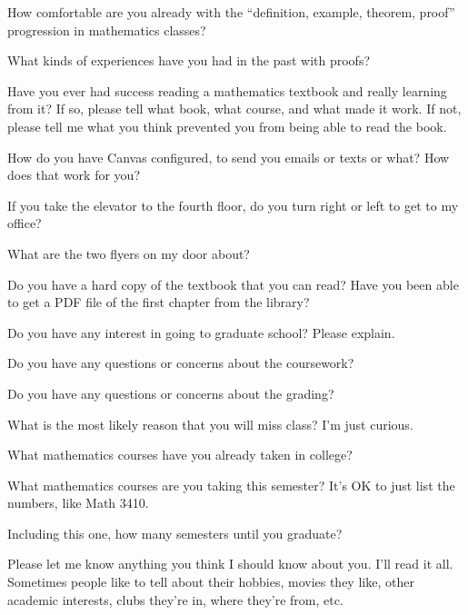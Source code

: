 \yourname


\blist{0.8in}

\item How comfortable are you already with the ``definition, example, theorem, proof'' progression in mathematics classes?

\item What kinds of experiences have you had in the past with proofs?

\item Have you ever had success reading a mathematics textbook and really learning from it?  If so, please tell what book, what course, and what made it work.  If not, please tell me what you think prevented you from being able to read the book.

\item How do you have Canvas configured, to send you emails or texts or what?  How does that work for you?

\item If you take the elevator to the fourth floor, do you turn right or left to get to my office?

\item What are the two flyers on my door about?

\item Do you have a hard copy of the textbook that you can read?  Have you been able to get a PDF file of the first chapter from the library?

\item Do you have any interest in going to graduate school?  Please explain.

\item Do you have any questions or concerns about the coursework?

\item Do you have any questions or concerns about the grading?

\item What is the most likely reason that you will miss class?  I'm just curious.

\item What mathematics courses have you already taken in college?

\item What mathematics courses are you taking this semester?
It's OK to just list the numbers, like Math 3410.

\item Including this one, how many semesters until you graduate?

\item Please let me know anything you think I should know about you.  I'll read it all.  Sometimes people like to tell about their hobbies, movies they like, other academic interests, clubs they're in, where they're from, etc.

\elist

\vfill          %
